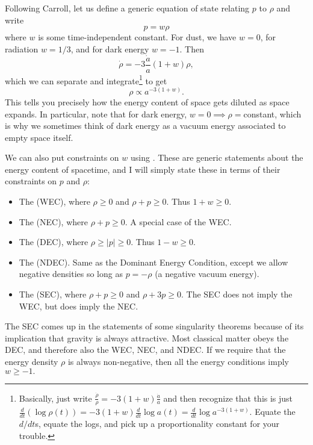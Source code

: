Following Carroll, let us define a generic equation of state relating $p$ to $\rho$ and write
$$p=w \rho$$
where $w$ is some time-independent constant. For dust, we have $w=0$, for radiation $w=1/3$, and for dark energy $w=-1$. Then
$$\dot \rho = -3 \frac{\dot a}{a}(1+w)\rho,$$
which we can separate and integrate\footnote{Basically, just write $\frac{\dot \rho}{\rho}=-3(1+w)\frac{\dot a}{a}$ and then recognize that this is just $\frac{d}{dt}(\log \rho(t))=-3(1+w)\frac{d}{dt}\log a(t)=\frac{d}{dt} \log a^{-3(1+w)}.$ Equate the $d/dt$s, equate the logs, and pick up a proportionality constant for your trouble.} to get
$$\rho \propto a^{-3(1+w)}.$$
This tells you precisely how the energy content of space gets diluted as space expands. In particular, note that for dark energy, $w=0\implies\rho=$constant, which is why we sometimes think of dark energy as a vacuum energy associated to empty space itself.

We can also put constraints on $w$ using . These are generic statements about the energy content of spacetime, and I will simply state these in terms of their constraints on $p$ and $\rho$:
\begin{itemize}
    \item The  (WEC), where $\rho\geq 0$ and $\rho+p\geq 0$. Thus $1+w\geq 0$.
    \item The  (NEC), where $\rho+p\geq 0$. A special case of the WEC.
    \item The  (DEC), where $\rho\geq |p|\geq 0.$ Thus $1-w \geq 0$. 
    \item The  (NDEC). Same as the Dominant Energy Condition, except we allow negative densities so long as $p=-\rho$ (a negative vacuum energy).
    \item The  (SEC), where $\rho+p\geq 0$ and $\rho+3p \geq 0$. The SEC does not imply the WEC, but does imply the NEC.
\end{itemize}
The SEC comes up in the statements of some singularity theorems because of its implication that gravity is always attractive. Most classical matter obeys the DEC, and therefore also the WEC, NEC, and NDEC. If we require that the energy density $\rho$ is always non-negative, then all the energy conditions imply $w\geq -1.$